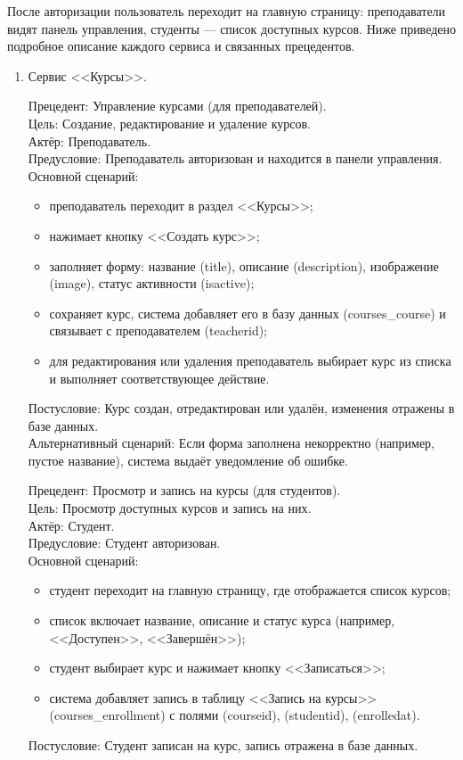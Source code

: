 После авторизации пользователь переходит на главную страницу: преподаватели видят панель управления, студенты --- список доступных курсов. Ниже приведено подробное описание каждого сервиса и связанных прецедентов.

\begin{enumerate}
	\item {Сервис <<Курсы>>}.
	
	{Прецедент: Управление курсами (для преподавателей)}. \\
	{Цель}: Создание, редактирование и удаление курсов. \\
	{Актёр}: Преподаватель. \\
	{Предусловие}: Преподаватель авторизован и находится в панели управления. \\
	{Основной сценарий}:
	\begin{itemize}
		\item преподаватель переходит в раздел <<Курсы>>;
		\item нажимает кнопку <<Создать курс>>;
		\item заполняет форму: название (title), описание (description), изображение (image), статус активности (isactive);
		\item сохраняет курс, система добавляет его в базу данных (courses\_course) и связывает с преподавателем (teacherid);
		\item для редактирования или удаления преподаватель выбирает курс из списка и выполняет соответствующее действие.
	\end{itemize}
	{Постусловие}: Курс создан, отредактирован или удалён, изменения отражены в базе данных. \\
	{Альтернативный сценарий}: Если форма заполнена некорректно (например, пустое название), система выдаёт уведомление об ошибке.
	
	{Прецедент: Просмотр и запись на курсы (для студентов)}. \\
	{Цель}: Просмотр доступных курсов и запись на них. \\
	{Актёр}: Студент. \\
	{Предусловие}: Студент авторизован. \\
	{Основной сценарий}:
	\begin{itemize}
		\item студент переходит на главную страницу, где отображается список курсов;
		\item список включает название, описание и статус курса (например, <<Доступен>>, <<Завершён>>);
		\item студент выбирает курс и нажимает кнопку <<Записаться>>;
		\item система добавляет запись в таблицу <<Запись на курсы>> (courses\_enrollment) с полями (courseid), (studentid), (enrolledat).
	\end{itemize}
	{Постусловие}: Студент записан на курс, запись отражена в базе данных.
	

\end{enumerate}
